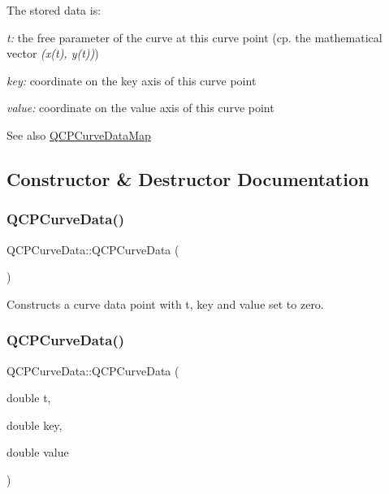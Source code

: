 The stored data is\+: \begin{DoxyItemize}
\item {\itshape t\+:} the free parameter of the curve at this curve point (cp. the mathematical vector {\itshape (x(t), y(t))}) \item {\itshape key\+:} coordinate on the key axis of this curve point \item {\itshape value\+:} coordinate on the value axis of this curve point\end{DoxyItemize}
\begin{DoxySeeAlso}{See also}
\mbox{\hyperlink{qcustomplot_8h_a444d37ec9cb2951b3a7fe443c34d1658}{Q\+C\+P\+Curve\+Data\+Map}} 
\end{DoxySeeAlso}


\subsection{Constructor \& Destructor Documentation}
\mbox{\label{class_q_c_p_curve_data_a48252779b5198a509d99c69ae223fbf8}} 
\subsubsection{\texorpdfstring{Q\+C\+P\+Curve\+Data()}{QCPCurveData()}\hspace{0.1cm}{\footnotesize\ttfamily [1/2]}}
{\footnotesize\ttfamily Q\+C\+P\+Curve\+Data\+::\+Q\+C\+P\+Curve\+Data (\begin{DoxyParamCaption}{ }\end{DoxyParamCaption})}

Constructs a curve data point with t, key and value set to zero. \mbox{\label{class_q_c_p_curve_data_a3586be0cc6f8db15bcdd0c0d03b0c173}} 
\subsubsection{\texorpdfstring{Q\+C\+P\+Curve\+Data()}{QCPCurveData()}\hspace{0.1cm}{\footnotesize\ttfamily [2/2]}}
{\footnotesize\ttfamily Q\+C\+P\+Curve\+Data\+::\+Q\+C\+P\+Curve\+Data (\begin{DoxyParamCaption}\item[{double}]{t,  }\item[{double}]{key,  }\item[{double}]{value }\end{DoxyParamCaption})}


